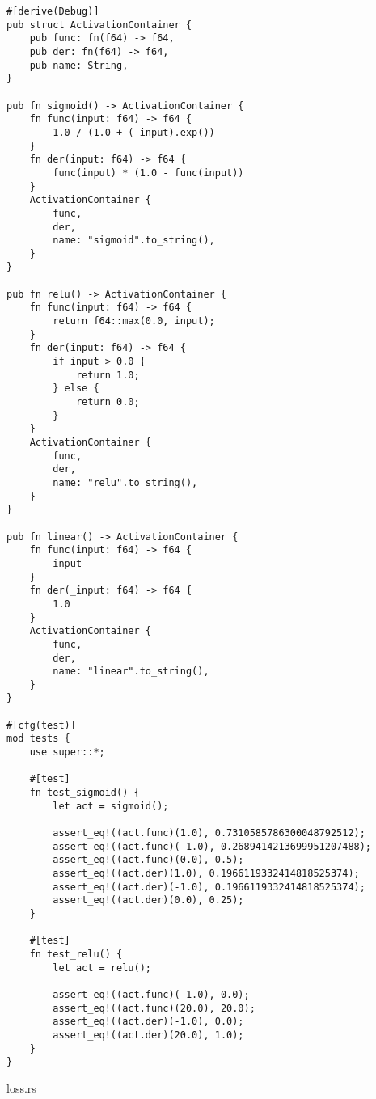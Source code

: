 \begin{verbatim}
#[derive(Debug)]
pub struct ActivationContainer {
    pub func: fn(f64) -> f64,
    pub der: fn(f64) -> f64,
    pub name: String,
}

pub fn sigmoid() -> ActivationContainer {
    fn func(input: f64) -> f64 {
        1.0 / (1.0 + (-input).exp())
    }
    fn der(input: f64) -> f64 {
        func(input) * (1.0 - func(input))
    }
    ActivationContainer {
        func,
        der,
        name: "sigmoid".to_string(),
    }
}

pub fn relu() -> ActivationContainer {
    fn func(input: f64) -> f64 {
        return f64::max(0.0, input);
    }
    fn der(input: f64) -> f64 {
        if input > 0.0 {
            return 1.0;
        } else {
            return 0.0;
        }
    }
    ActivationContainer {
        func,
        der,
        name: "relu".to_string(),
    }
}

pub fn linear() -> ActivationContainer {
    fn func(input: f64) -> f64 {
        input
    }
    fn der(_input: f64) -> f64 {
        1.0
    }
    ActivationContainer {
        func,
        der,
        name: "linear".to_string(),
    }
}

#[cfg(test)]
mod tests {
    use super::*;

    #[test]
    fn test_sigmoid() {
        let act = sigmoid();

        assert_eq!((act.func)(1.0), 0.7310585786300048792512);
        assert_eq!((act.func)(-1.0), 0.2689414213699951207488);
        assert_eq!((act.func)(0.0), 0.5);
        assert_eq!((act.der)(1.0), 0.1966119332414818525374);
        assert_eq!((act.der)(-1.0), 0.1966119332414818525374);
        assert_eq!((act.der)(0.0), 0.25);
    }

    #[test]
    fn test_relu() {
        let act = relu();

        assert_eq!((act.func)(-1.0), 0.0);
        assert_eq!((act.func)(20.0), 20.0);
        assert_eq!((act.der)(-1.0), 0.0);
        assert_eq!((act.der)(20.0), 1.0);
    }
}

\end{verbatim}
\noindent loss.rs

